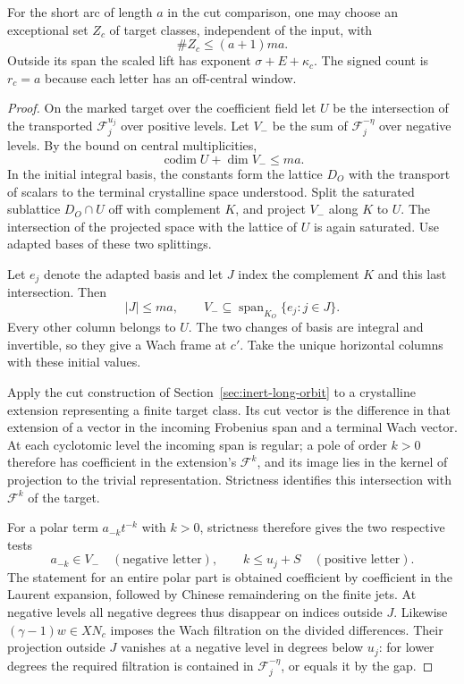 \begin{lemma}\label{lem:short-arc-exceptional-span}
For the short arc of length \(a\) in the cut comparison,
one may choose an exceptional set \(Z_c\) of target classes, independent of the input, with
\[
 \#Z_c\le(a+1)ma.
\] Outside its span the scaled lift has
exponent \(\sigma+E+\kappa_c\). The signed count is
\(r_c=a\) because each letter has an off-central window.
\end{lemma}

\begin{proof}
\label{par:short-exceptions}
On the marked target over the coefficient field let \(U\) be the
intersection of the transported \(\mathcal F_j^{u_j}\) over
positive levels. Let \(V_-\) be the sum of
\(\mathcal F_j^{-\eta}\) over negative levels. By the bound on
central multiplicities,
\[
 \operatorname{codim}U+\dim V_-\le ma .
\]
In the initial integral basis, the constants form the lattice
\(D_O\) with the transport of scalars to the terminal crystalline
space understood. Split the saturated sublattice \(D_O\cap U\)
off with complement \(K\), and project \(V_-\) along \(K\)
to \(U\). The intersection of the projected space with the
lattice of \(U\) is again saturated. Use adapted bases of these
two splittings.

Let \(e_j\) denote the adapted basis and let \(J\) index the complement \(K\) and this last intersection. Then
\[
 |J|\le ma,\qquad V_-\subseteq\operatorname{span}_{K_O}\{e_j:j\in J\}.
\]
Every other column belongs to \(U\).
The two changes of basis are integral and invertible, so they
give a Wach frame at \(c'\). Take the unique horizontal columns
with these initial values.

Apply the cut construction of Section~\ref{sec:inert-long-orbit}
to a crystalline extension representing a finite target class.
Its cut vector is the difference in that extension of a vector
in the incoming Frobenius span and a terminal Wach vector.
At each cyclotomic level the incoming span is regular; a pole
of order \(k>0\) therefore has coefficient in the extension's
\(\mathcal F^k\), and its image lies in the kernel of projection
to the trivial representation. Strictness identifies this
intersection with \(\mathcal F^k\) of the target.

For a polar term \(a_{-k}t^{-k}\) with \(k>0\), strictness therefore gives the two respective tests
\[
 a_{-k}\in V_-\quad(\text{negative letter}),\qquad k\le u_j+S\quad(\text{positive letter}).
\]
The statement for an entire polar part is obtained
coefficient by coefficient in the Laurent expansion, followed
by Chinese remaindering on the finite jets. At negative levels
all negative degrees thus disappear on indices outside \(J\).
Likewise \((\gamma-1)w\in XN_c\) imposes the Wach filtration
on the divided differences. Their projection outside \(J\)
vanishes at a negative level in degrees below \(u_j\):
for lower degrees the required filtration is contained in
\(\mathcal F_j^{-\eta}\), or equals it by the gap.


\end{proof}
